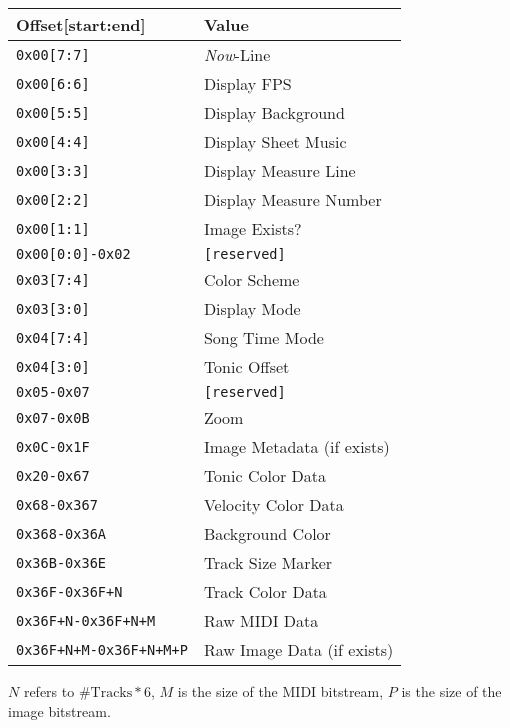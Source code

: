 \documentclass[english]{article}
\makeatletter
\newenvironment{restoretext}%
    {\@parboxrestore%
     \begin{adjustwidth}{}{\leftmargin}%
    }{\end{adjustwidth}
     }
\def\rcbegin{\begin{restoretext}\centering}
\def\rcend{\end{restoretext}}
\providecommand{\mi}[1]{\texttt{#1}}
\makeatother
\begin{document}
\rcbegin
\begin{tabular}{|l|l|}
  \hline
  \textbf{Offset[start:end]}    & \textbf{Value} \\
  \hline
  \mi{0x00[7:7]}                  & \textit{Now}-Line \\
  \mi{0x00[6:6]}                  & Display FPS \\
  \mi{0x00[5:5]}                  & Display Background \\
  \mi{0x00[4:4]}                  & Display Sheet Music \\
  \mi{0x00[3:3]}                  & Display Measure Line \\
  \mi{0x00[2:2]}                  & Display Measure Number \\
  \mi{0x00[1:1]}                  & Image Exists? \\
  \mi{0x00[0:0]-0x02}             & \mi{[reserved]} \\
  \mi{0x03[7:4]}                  & Color Scheme \\
  \mi{0x03[3:0]}                  & Display Mode \\
  \mi{0x04[7:4]}                  & Song Time Mode \\
  \mi{0x04[3:0]}                  & Tonic Offset \\
  \mi{0x05-0x07}			            & \mi{[reserved]} \\
  \mi{0x07-0x0B}                  & Zoom \\
  \mi{0x0C-0x1F}                  & Image Metadata (if exists) \\
  \mi{0x20-0x67}                  & Tonic Color Data \\
  \mi{0x68-0x367}                 & Velocity Color Data \\
  \mi{0x368-0x36A}                & Background Color \\
  \mi{0x36B-0x36E}                & Track Size Marker \\
  \mi{0x36F-0x36F+N}              & Track Color Data \\
  \mi{0x36F+N-0x36F+N+M}          & Raw MIDI Data \\
  \mi{0x36F+N+M-0x36F+N+M+P}      & Raw Image Data (if exists) \\

  \hline
\end{tabular}
\rcend

\vspace{1em}

$N$ refers to $\text{\# Tracks}*6$, $M$ is the size of the MIDI bitstream, $P$ is the size of the image bitstream.
\end{document}
